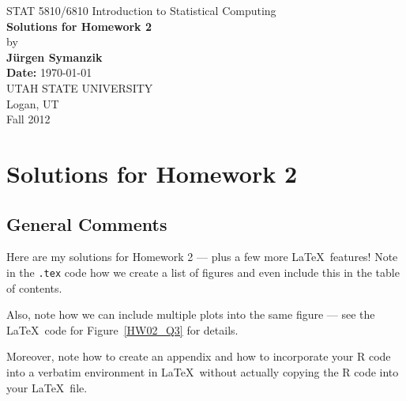 \documentclass[12pt]{article}
\begin{document}
\begin{titlepage}

\begin{center}
{\large STAT 5810/6810 Introduction to Statistical Computing} \\[4cm]

{\LARGE \bf Solutions for Homework  2} \\[1cm]
by \\[0.5cm]
{\bf J\"urgen Symanzik} \\[2.5cm]
{\bf Date:} \today \\[2cm]

UTAH STATE UNIVERSITY \\[0.5cm]
Logan, UT \\[0.5cm]
Fall 2012 \\[0.5cm]
\end{center}

\thispagestyle{empty}
\vfill
\end{titlepage}


\newpage 



\tableofcontents


\newpage


%

\listoffigures
{}

\newpage 




\section{Solutions for Homework 2}

\subsection{General Comments}

Here are my solutions for Homework 2 --- plus a few more \LaTeX\ features! Note in the {\tt .tex} code
how we create a list of figures and even include this in the table of contents.

Also, note how we can include multiple plots into the same figure ---
see the \LaTeX\ code for Figure~\ref{HW02_Q3} for details.

Moreover, note how to create an appendix and how to incorporate your R code
into a verbatim environment in \LaTeX\ without actually copying the R code into
your  \LaTeX\ file.
\end{document}
